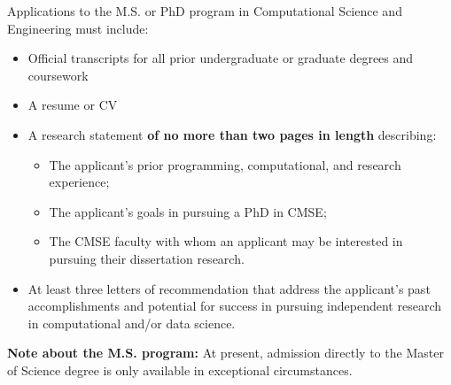 Applications to the M.S. or PhD program in Computational Science and
Engineering must include:

\begin{itemize}
\item Official transcripts for all prior undergraduate or graduate degrees and coursework
\item A resume or CV
\item A research statement \textbf{of no more than two pages in length}
  describing:  

\begin{itemize}
  \item The applicant's prior programming, computational, and research experience;  
  \item The applicant's goals in pursuing a PhD in CMSE;  
  \item  The CMSE faculty with whom an applicant may be interested in
    pursuing their dissertation research.  
\end{itemize}

\item At least three letters of recommendation that address the applicant's past accomplishments and potential for success in pursuing independent research in computational and/or data science.
\end{itemize}

\noindent
\textbf{Note about the M.S. program:} At present, admission directly to the Master of Science degree is only available in exceptional circumstances.  